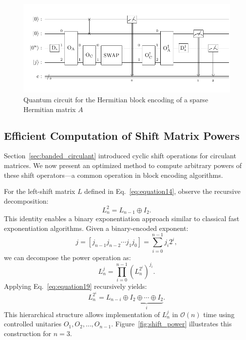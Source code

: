 \documentclass{article}
\begin{document}
\begin{figure}[htbp]
  \centering
  \includegraphics{pdf/hermitian_circuit}
  \caption{Quantum circuit for the Hermitian block encoding of a sparse Hermitian matrix $A$}
  \label{fig:hermitian_encoding}
\end{figure}

\subsection{Efficient Computation of Shift Matrix Powers}

Section~\ref{sec:banded_circulant} introduced cyclic shift operations for circulant matrices. We now present an optimized method to compute arbitrary powers of these shift operators—a common operation in block encoding algorithms.

For the left-shift matrix $L$ defined in Eq.~\eqref{eq:equation14}, observe the recursive decomposition:
\begin{equation}
L_n^2 = L_{n-1} \oplus I_2.\label{eq:equation19}
\end{equation}
This identity enables a binary exponentiation approach similar to classical fast exponentiation algorithms. Given a binary-encoded exponent:
\begin{equation}
j = [j_{n-1} j_{n-2} \cdots j_1 j_0] = \sum_{i=0}^{n-1} j_i 2^i,
\end{equation}
we can decompose the power operation as:
\begin{equation}
L_n^j = \prod_{i=0}^{n-1} \left(L_n^{2^i} \right)^{j_i}.
\end{equation}
Applying Eq.~\ref{eq:equation19} recursively yields:
\begin{equation}
L_n^{2^i} = L_{n-i} \oplus \underbrace{I_2 \oplus \cdots \oplus I_2}_{i}.
\end{equation}
This hierarchical structure allows implementation of $L_n^j$ in $\mathcal{O}(n)$ time using controlled unitaries $O_1, O_2, \ldots, O_{n-1}$. Figure~\ref{fig:shift_power} illustrates this construction for $n=3$.
\end{document}
